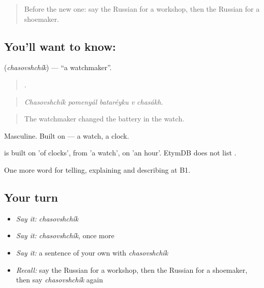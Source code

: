 \label{lesson:RU-C447-chasovshchik}



\begin{quote}
Before the new one: say the Russian for a workshop, then the Russian for a shoemaker.
\end{quote}

\subsection*{You'll want to know: }
\textbf{} (\emph{chasovshchík}) — \textquotedblleft{}a watchmaker\textquotedblright{}.

\begin{quote}
    .
\end{quote}

\begin{quote}
\emph{Chasovshchík pomenyál bataréyku v chasákh.}
\end{quote}

\begin{quote}
The watchmaker changed the battery in the watch.
\end{quote}

Masculine. Built on \emph{} — a watch, a clock.

\begin{cousinweb}
\emph{} is built on \emph{} 'of clocks', from \emph{} 'a watch', on \emph{} 'an hour'. EtymDB does not list \emph{}.
\end{cousinweb}

\begin{grammarlens}[title={What you've built}]
One more word for telling, explaining and describing at B1.
\end{grammarlens}

\subsection*{Your turn}
\begin{itemize}
\raggedright
  \item \emph{Say it:} \emph{chasovshchík}
  \item \emph{Say it:} \emph{chasovshchík}, once more
  \item \emph{Say it:} a sentence of your own with \emph{chasovshchík}
  \item \emph{Recall:} say the Russian for a workshop, then the Russian for a shoemaker, then say \emph{chasovshchík} again
\end{itemize}

